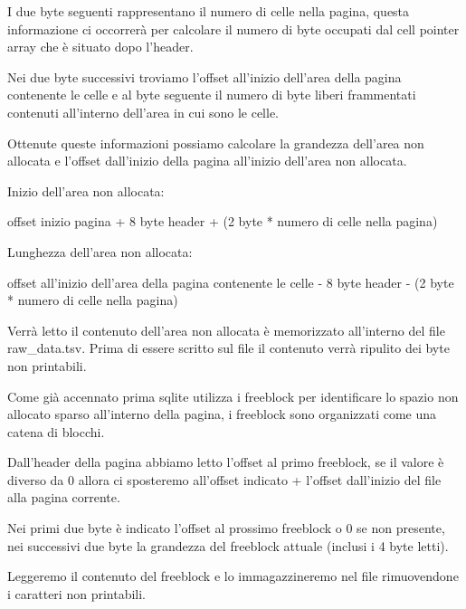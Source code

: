 I due byte seguenti rappresentano il numero di celle nella pagina, questa informazione ci occorrerà per calcolare il numero di byte occupati dal cell pointer array che è situato dopo l’header.

\medskip


Nei due byte successivi troviamo l’offset all’inizio dell’area della pagina contenente le celle e al byte seguente il numero di byte liberi frammentati contenuti all’interno dell’area in cui sono le celle.

\medskip


Ottenute queste informazioni possiamo calcolare la grandezza dell’area non allocata e l’offset dall’inizio della pagina all’inizio dell’area non allocata.

\medskip

Inizio dell’area non allocata:

\medskip

offset inizio pagina + 8 byte header + (2 byte * numero di celle nella pagina)

\medskip

Lunghezza dell’area non allocata:

\medskip

offset all’inizio dell’area della pagina contenente le celle -  8 byte header - (2 byte * numero di celle nella pagina)

\medskip


Verrà letto il contenuto dell’area non allocata è memorizzato all’interno del file raw\string_data.tsv.
Prima di essere scritto sul file il contenuto verrà ripulito dei byte non printabili.

\medskip

Come già accennato prima sqlite utilizza i freeblock per identificare lo spazio non allocato sparso all’interno della pagina, i freeblock sono organizzati come una catena di blocchi.

\medskip

Dall’header della pagina abbiamo letto l’offset al primo freeblock, se il valore è diverso da 0 allora ci sposteremo all’offset indicato + l’offset dall’inizio del file alla pagina corrente.

\medskip

Nei primi due byte è indicato l’offset al prossimo freeblock o 0 se non presente, nei successivi due byte la grandezza del freeblock attuale (inclusi i 4 byte letti).

\medskip

Leggeremo il contenuto del freeblock e lo immagazzineremo nel file rimuovendone i caratteri non printabili.

